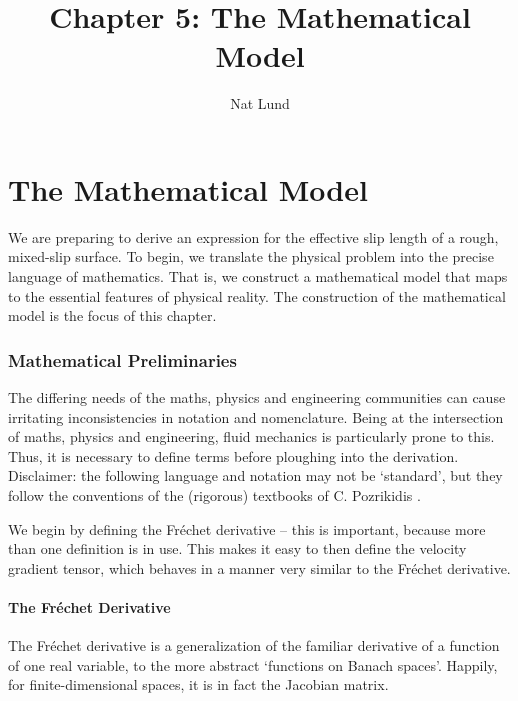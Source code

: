 \documentclass[12pt, a4paper, twoside, openright]{book}
\title{Chapter 5: The Mathematical Model}
\author{Nat Lund}
\begin{document}
\chapter{The Mathematical Model}\label{C:model}

We are preparing to derive an expression for the effective slip length of a rough, mixed-slip surface.  To begin, we translate the physical problem into the precise language of mathematics.  That is, we construct a mathematical model that maps to the essential features of physical reality.  The construction of the mathematical model is the focus of this chapter.



\subsection{Mathematical Preliminaries}


The differing needs of the maths, physics and engineering communities can cause irritating inconsistencies in notation and nomenclature.  Being at the intersection of maths, physics and engineering, fluid mechanics is particularly prone to this.  Thus, it is necessary to define terms before ploughing into the derivation.  Disclaimer: the following language and notation may not be `standard', but they follow the conventions of the (rigorous) textbooks of C. Pozrikidis \cite{Pozrikidis1997, Pozrikidis2001}.


We begin by defining the Fr\'{e}chet derivative --  this is important, because more than one definition is in use.  This makes it easy to then define the velocity gradient tensor, which behaves in a manner very similar to the Fr\'{e}chet derivative.

\clearpage
\subsubsection{The Fr\'{e}chet Derivative}
The Fr\'{e}chet derivative is a generalization of the familiar derivative of a function of one real variable, to the more abstract `functions on Banach spaces'.  Happily, for finite-dimensional spaces, it is in fact the Jacobian matrix.
\end{document}

